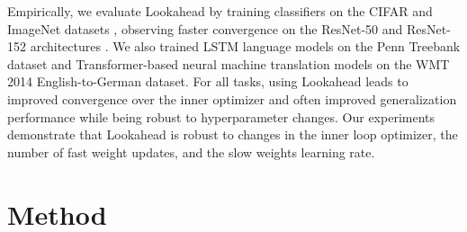\documentclass{article}
\begin{document}
Empirically, we evaluate Lookahead by  
training classifiers on the CIFAR \citep{krizhevsky2009learning} and ImageNet datasets \citep{deng2009imagenet}, observing faster convergence on the ResNet-50 and ResNet-152 architectures \citep{he2016deep}. We also trained LSTM language models on the Penn Treebank dataset \citep{marcus1993building} and Transformer-based \citep{vaswani2017attention} neural machine translation models on the WMT 2014 English-to-German dataset. For all tasks, using Lookahead leads to improved convergence over the inner optimizer and often improved generalization performance while being robust to hyperparameter changes. Our experiments demonstrate that Lookahead is robust to changes in the inner loop optimizer, the number of fast weight updates, and the slow weights learning rate. 













 \section{Method}
\label{sec:method}
\end{document}
